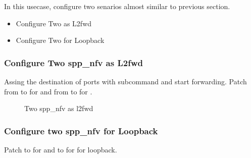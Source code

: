 \documentclass[a4paper,11pt,openany,oneside,english]{sphinxmanual}
\begin{document}
In this usecase, configure two senarios almost similar to previous section.
\begin{itemize}
\item {} 
Configure Two  as L2fwd

\item {} 
Configure Two  for Loopback

\end{itemize}


\subsubsection{Configure Two spp\_nfv as L2fwd}
\label{\detokenize{usecases/spp_nfv:configure-two-spp-nfv-as-l2fwd}}
Assing the destination of ports with  subcommand and
start forwarding.
Patch from  to  for  and
from  to  for .

\begin{sphinxVerbatim}[commandchars=\\\{\},formatcom=\footnotesize]
\end{sphinxVerbatim}

\begin{figure}[htbp]
\centering
\capstart

\noindent{}
\caption{Two spp\_nfv as l2fwd}\label{\detokenize{usecases/spp_nfv:id2}}\label{\detokenize{usecases/spp_nfv:figure-spp-two-nfv-as-l2fwd}}\end{figure}


\subsubsection{Configure two spp\_nfv for Loopback}
\label{\detokenize{usecases/spp_nfv:configure-two-spp-nfv-for-loopback}}
Patch  to  for  and
 to  for  for loopback.
\end{document}
